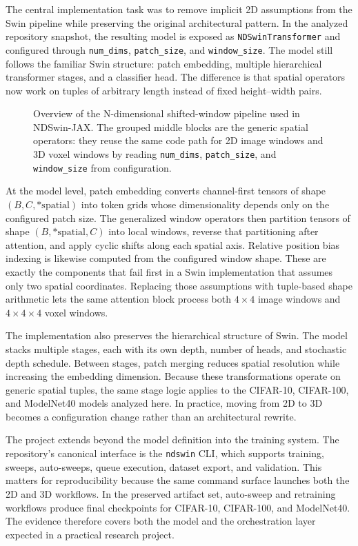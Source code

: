 The central implementation task was to remove implicit 2D assumptions from the Swin pipeline while preserving the original architectural pattern. In the analyzed repository snapshot, the resulting model is exposed as \texttt{NDSwinTransformer} and configured through \texttt{num\_dims}, \texttt{patch\_size}, and \texttt{window\_size}. The model still follows the familiar Swin structure: patch embedding, multiple hierarchical transformer stages, and a classifier head. The difference is that spatial operators now work on tuples of arbitrary length instead of fixed height--width pairs.

\begin{figure}[t]
  \centering
  
  \caption{Overview of the N-dimensional shifted-window pipeline used in NDSwin-JAX. The grouped middle blocks are the generic spatial operators: they reuse the same code path for 2D image windows and 3D voxel windows by reading \texttt{num\_dims}, \texttt{patch\_size}, and \texttt{window\_size} from configuration.}
  \label{fig:architecture}
\end{figure}

At the model level, patch embedding converts channel-first tensors of shape \((B, C, *\text{spatial})\) into token grids whose dimensionality depends only on the configured patch size. The generalized window operators then partition tensors of shape \((B, *\text{spatial}, C)\) into local windows, reverse that partitioning after attention, and apply cyclic shifts along each spatial axis. Relative position bias indexing is likewise computed from the configured window shape. These are exactly the components that fail first in a Swin implementation that assumes only two spatial coordinates. Replacing those assumptions with tuple-based shape arithmetic lets the same attention block process both \(4 \times 4\) image windows and \(4 \times 4 \times 4\) voxel windows.

The implementation also preserves the hierarchical structure of Swin. The model stacks multiple stages, each with its own depth, number of heads, and stochastic depth schedule. Between stages, patch merging reduces spatial resolution while increasing the embedding dimension. Because these transformations operate on generic spatial tuples, the same stage logic applies to the CIFAR-10, CIFAR-100, and ModelNet40 models analyzed here. In practice, moving from 2D to 3D becomes a configuration change rather than an architectural rewrite.

The project extends beyond the model definition into the training system. The repository's canonical interface is the \texttt{ndswin} CLI, which supports training, sweeps, auto-sweeps, queue execution, dataset export, and validation. This matters for reproducibility because the same command surface launches both the 2D and 3D workflows. In the preserved artifact set, auto-sweep and retraining workflows produce final checkpoints for CIFAR-10, CIFAR-100, and ModelNet40. The evidence therefore covers both the model and the orchestration layer expected in a practical research project.

